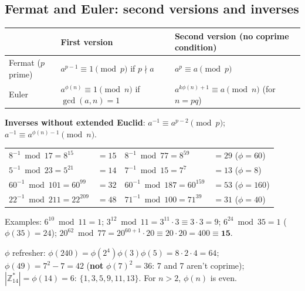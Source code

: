 \subsection{Fermat and Euler: second versions and inverses}
\begin{center}\small
\begin{tabular}{@{}lll@{}}
\toprule
 & First version & Second version (no coprime condition)\\
\midrule
Fermat ($p$ prime) & $a^{p-1} \equiv 1 \pmod p$ if $p \nmid a$ & $a^p \equiv a \pmod p$\\
Euler & $a^{\phi(n)} \equiv 1 \pmod n$ if $\gcd(a,n) = 1$ & $a^{k\phi(n)+1} \equiv a \pmod n$ (for $n = pq$)\\
\bottomrule
\end{tabular}
\end{center}
\textbf{Inverses without extended Euclid}: $a^{-1} \equiv a^{p-2} \pmod p$; \;$a^{-1} \equiv a^{\phi(n)-1} \pmod n$.
\begin{center}\small
\begin{tabular}{@{}ll@{\qquad}ll@{}}
\toprule
$8^{-1} \bmod 17 = 8^{15}$ & $= 15$ & $8^{-1} \bmod 77 = 8^{59}$ & $= 29$ \;($\phi = 60$)\\
$5^{-1} \bmod 23 = 5^{21}$ & $= 14$ & $7^{-1} \bmod 15 = 7^{7}$ & $= 13$ \;($\phi = 8$)\\
$60^{-1} \bmod 101 = 60^{99}$ & $= 32$ & $60^{-1} \bmod 187 = 60^{159}$ & $= 53$ \;($\phi = 160$)\\
$22^{-1} \bmod 211 = 22^{209}$ & $= 48$ & $71^{-1} \bmod 100 = 71^{39}$ & $= 31$ \;($\phi = 40$)\\
\bottomrule
\end{tabular}
\end{center}
Examples: $6^{10} \bmod 11 = 1$; \;$3^{12} \bmod 11 = 3^{11} \cdot 3 \equiv 3 \cdot 3 = 9$; \;$6^{24} \bmod 35 = 1$ ($\phi(35) = 24$); \;$20^{62} \bmod 77 = 20^{60+1} \cdot 20 \equiv 20 \cdot 20 = 400 \equiv \mathbf{15}$.

$\phi$ refresher: $\phi(240) = \phi(2^4)\phi(3)\phi(5) = 8 \cdot 2 \cdot 4 = 64$; \;$\phi(49) = 7^2 - 7 = 42$ (\textbf{not} $\phi(7)^2 = 36$: 7 and 7 aren't coprime); $|\mathbb{Z}_{14}^*| = \phi(14) = 6$: $\{1, 3, 5, 9, 11, 13\}$. For $n > 2$, $\phi(n)$ is even.


